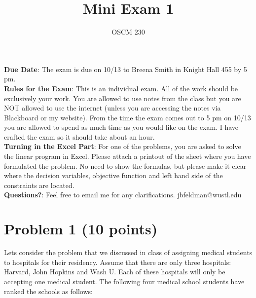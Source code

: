 \documentclass{article}[11 pt]    %
\begin{document}
 
\title{Mini Exam 1}

\author{OSCM 230}

\maketitle

\noindent \textbf{Due Date}:  The exam is due on 10/13 to Breena Smith in Knight Hall 455 by 5 pm.
\\

\noindent \textbf{Rules for the Exam}:  This is an individual exam.  All of the work should be exclusively your work.  You are allowed to use notes from the class but you are NOT allowed to use the internet (unless you are accessing the notes via Blackboard or my website).   From the time the exam comes out to 5 pm on 10/13 you are allowed to spend as much time as you would like on the exam.  I have crafted the exam so it should take about an hour.
\\

\noindent \textbf{Turning in the Excel Part}: For one of the problems, you are asked to solve the linear program in Excel.  Please attach a printout of the sheet where you have formulated the problem.  No need to show the formulas, but please make it clear where the decision variables, objective function and left hand side of the constraints are located. 
\\

\noindent \textbf{Questions?}: Feel free to email me for any clarifications. jbfeldman@wustl.edu
\\

\section*{Problem 1 (10 points)}
Lets consider the problem that we discussed in class of assigning medical students to hospitals for their residency.  Assume that there are only three hospitals:  Harvard, John Hopkins and Wash U.  Each of these hospitals will only be accepting one medical student.  The following four medical school students have ranked the schools as follows:
\\
\end{document}
